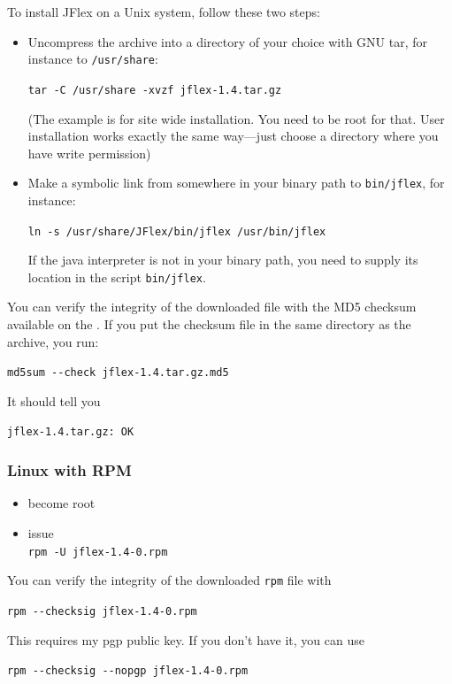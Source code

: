 \documentclass[11pt]{scrartcl}
\newcommand{\ver}{1.4}
\begin{document}
To install JFlex on a Unix system, follow these two steps:
\begin{itemize}
\item
  Uncompress the archive into a directory of your choice
  with GNU tar, for instance to \texttt{/usr/share}:

  \texttt{tar -C /usr/share -xvzf jflex-\ver.tar.gz}
  
  (The example is for site wide installation. You need to
  be root for that. User installation works exactly the
  same way---just choose a directory where you have write
  permission)

\item
  Make a symbolic link from somewhere in your binary 
  path to \texttt{bin/jflex}, for instance:

  \texttt{ln -s /usr/share/JFlex/bin/jflex /usr/bin/jflex}

  If the java interpreter is not in your binary path, you
  need to supply its location in the script \texttt{bin/jflex}.
\end{itemize}

You can verify the integrity of the downloaded file with
the MD5 checksum available on the . 
If you put the checksum file in the same directory
as the archive, you run:

\verb+md5sum --check +\texttt{jflex-\ver.tar.gz.md5}

It should tell you

\texttt{jflex-\ver.tar.gz: OK}

\subsubsection{Linux with RPM}

\begin{itemize}
\item
  become root
\item issue\\
  \texttt{rpm -U jflex-\ver-0.rpm}
\end{itemize}

You can verify the integrity of the downloaded \texttt{rpm} file with

\verb+rpm --checksig +\texttt{jflex-\ver-0.rpm}

This requires my pgp public key. If you don't have it, you can use

\verb+rpm --checksig --nopgp +\texttt{jflex-\ver-0.rpm}
\end{document}
